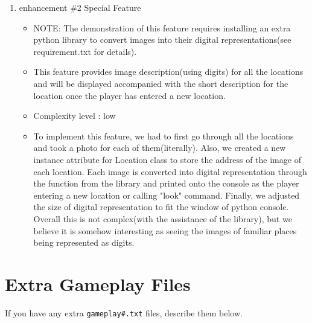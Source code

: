 \documentclass[11pt]{article}
\begin{document}
\begin{enumerate}
\item enhancement \#2 Special Feature
	\begin{itemize}
    \item NOTE: The demonstration of this feature requires installing an extra python library to convert images into their digital representations(see requirement.txt for details). 
	\item This feature provides image description(using digits) for all the locations and will be displayed accompanied with the short description for the location once the player has entered a new location. 
	\item Complexity level : low
	\item To implement this feature, we had to first go through all the locations and took a photo for each of them(literally). Also, we created a new instance attribute for Location class to store the address of the image of each location. Each image is converted into digital representation through the function from the library and printed onto the console as the player entering a new location or calling "look" command. Finally, we adjusted the size of digital representation to fit the window of python console. Overall this is not complex(with the assistance of the library), but we believe it is somehow interesting as seeing the images of familiar places being represented as digits.
    
	\end{itemize}

\end{enumerate}


\section*{Extra Gameplay Files}

If you have any extra \texttt{gameplay\#.txt} files, describe them below.
\end{document}

